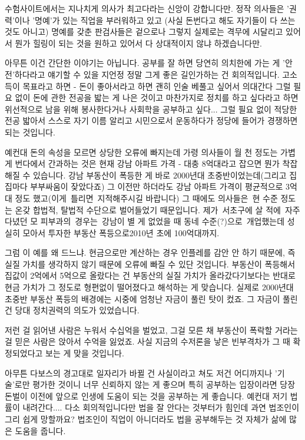 수험사이트에서는 지나치게 의사가 최고다라는 신앙이 강합니다만.
정작 의사들은 '권력'이나 '명예'가 있는 직업을 부러워하고 있고 (사실 돈번다고 해도 자기들이 다 쓰는 것도 아니고)
명예를 갖춘 판검사들은 겉으로나 그렇지 실제로는 격무에 시달리고 있어서 뭔가 힐링이 되는 것을 원하고 있어서
다 상대적이지 않냐 하겠습니다만.
\vspace{5mm}

아무튼 이건 간단한 이야기는 아닙니다.
공부를 잘 하면 당연히 의치한에 가는 게 '안전'하다라고 얘기할 수 있을 지언정 정말 그게 좋은 길인가하는 건 회의적입니다.
고소득이 목표라고 하면 - 돈이 좋아서라고 하면 괜히 인술 베풀고 싶어서 의대간다 그럴 필요 없이
돈에 관한 전공을 밟는 게 나은 것이고
마찬가지로 정치를 하고 싶다라고 하면 위선적으로 남을 위해 봉사한다거나 사회학을 공부하고 싶다... 그럴 필요 없이
적당한 전공 밟아서 스스로 자기 이름 알리고 시민으로서 운동하다가 정당에 들어가 경쟁하면 되는 것입니다.
\vspace{5mm}

예컨대 돈의 속성을 모르면 상당한 오류에 빠지는데
가령 의사들이 월 천 정도는 가볍게 번다에서 간과하는 것은 현재 강남 아파트 가격 - 대충 8억대라고 잡으면 뭔가 착잡해질 수 있습니다.
강남 부동산이 폭등한 게 바로 2000년대 초중반이었는데(그리고 집집마다 부부싸움이 잦았다죠)
그 이전만 하더라도 강남 아파트 가격이 평균적으로 3억대 정도 했고(이게 틀리면 지적해주시길 바랍니다)
그 때에도 의사들은 현 수준 정도는 온갖 합법적, 탈법적 수단으로 벌어들었기 때문입니다.
제가 서초구에 살 적에 자주 다녔던 모 피부과의 경우는 강남이 별 게 없었을 때 동네 수준(?)으로 개업했는데
성실히 모아서 투자한 부동산 폭등으로2010년 초에 100억대까지.
\vspace{5mm}

그럼 이 예를 왜 드느냐.
현금으로만 계산하는 경우 인플레를 감안 안 하기 때문에, 즉 실질 가치를 생각하지 않기 때문에 오류에 빠질 수 있단 것입니다.
부동산이 폭등해서 집값이 2억에서 5억으로 올랐다는 건 부동산의 실질 가치가 올라갔다기보다는
반대로 현금 가치가 그 정도로 형편없이 떨어졌다고 해석하는 게 맞습니다.
실제로 2000년대 초중반 부동산 폭등의 배경에는 시중에 엄청난 자금이 풀린 탓이 컸죠.
그 자금이 풀린 건 당대 정치권력의 의도가 있었습니다.
\vspace{5mm}

저런 걸 읽어낸 사람은 누워서 수십억을 벌었고, 그걸 모른 채 부동산이 폭락할 거라는 걸 믿은 사람은 앉아서 수억을 잃었죠.
사실 지금의 수저론을 낳은 빈부격차가 그 때 확정되었다고 보는 게 맞을 것입니다.
\vspace{5mm}

아무튼 다보스의 경고대로 일자리가 바뀔 건 사실이라고 쳐도
저건 어디까지나 '기술'로만 평가한 것이니 너무 신뢰하지 않는 게 좋으며
특히 공부하는 입장이라면 당장 돈벌이 이전에 앞으로 인생에 도움이 되는 것을 공부하는 게 좋습니다.
예컨대 저기 법률이 내려간다.... 다소 회의적입니다만 법을 잘 안다는 것부터가 힘인데 과연 법조인이 그리 쉽게 망할까요?
법조인이 직업이 아니더라도 법을 공부해두는 것 자체가 삶에 많은 도움을 줍니다.
\vspace{5mm}

